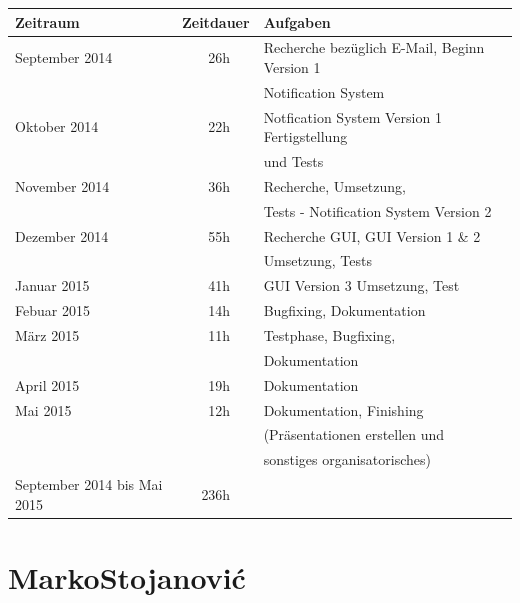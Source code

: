 \documentclass[12pt,a4paper]{report}
\begin{document}
\begin{onehalfspace}
\begin{tabular}{|l|c|l|}
\hline
\textbf{Zeitraum} & \textbf{Zeitdauer} & \textbf{Aufgaben} \\ \hline \hline
September 2014 & ~26h & Recherche bezüglich E-Mail, Beginn Version 1\\&&Notification System \\ \hline
Oktober 2014 & ~22h & Notfication System Version 1 Fertigstellung\\&&und Tests \\ \hline
November 2014 & ~36h & Recherche, Umsetzung, \\&&Tests - Notification System Version 2\\ \hline
Dezember 2014 & ~55h & Recherche GUI, GUI Version 1 \& 2 \\&&Umsetzung, Tests\\ \hline
Januar 2015 & ~41h & GUI Version 3 Umsetzung, Test\\ \hline
Febuar 2015 & ~14h & Bugfixing, Dokumentation\\ \hline
März 2015 & ~11h & Testphase, Bugfixing,\\&& Dokumentation\\ \hline
April 2015 & ~19h & Dokumentation\\ \hline
Mai 2015 & ~12h & Dokumentation, Finishing \\&&(Präsentationen erstellen und \\&&sonstiges organisatorisches)\\
\hline \hline
September 2014 bis Mai 2015 & 236h &\\ \hline
\end{tabular}

\chapter{MarkoStojanovi\'{c}}
\begin{center}
\begin{tabular}{|l|c|l|}


\end{tabular}
\end{center}
\end{onehalfspace}
\end{document}
